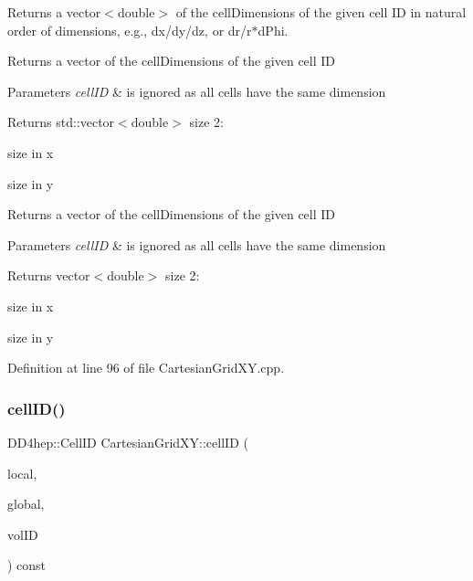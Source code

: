 Returns a vector$<$double$>$ of the cell\+Dimensions of the given cell ID in natural order of dimensions, e.\+g., dx/dy/dz, or dr/r$\ast$d\+Phi. 

Returns a vector of the cell\+Dimensions of the given cell ID 
\begin{DoxyParams}{Parameters}
{\em cell\+ID} & is ignored as all cells have the same dimension \\
\hline
\end{DoxyParams}
\begin{DoxyReturn}{Returns}
std\+::vector$<$double$>$ size 2\+:
\begin{DoxyEnumerate}
\item size in x
\item size in y
\end{DoxyEnumerate}
\end{DoxyReturn}
Returns a vector of the cell\+Dimensions of the given cell ID 
\begin{DoxyParams}{Parameters}
{\em cell\+ID} & is ignored as all cells have the same dimension \\
\hline
\end{DoxyParams}
\begin{DoxyReturn}{Returns}
vector$<$double$>$ size 2\+:
\begin{DoxyEnumerate}
\item size in x
\item size in y 
\end{DoxyEnumerate}
\end{DoxyReturn}


Definition at line 96 of file Cartesian\+Grid\+X\+Y.\+cpp.

\hypertarget{class_d_d4hep_1_1_geometry_1_1_cartesian_grid_x_y_a83c05bd3b39fab868f02b6e44e206a26}{}\label{class_d_d4hep_1_1_geometry_1_1_cartesian_grid_x_y_a83c05bd3b39fab868f02b6e44e206a26} 
\subsubsection{\texorpdfstring{cell\+I\+D()}{cellID()}}
{\footnotesize\ttfamily D\+D4hep\+::\+Cell\+ID Cartesian\+Grid\+X\+Y\+::cell\+ID (\begin{DoxyParamCaption}\item[{const \hyperlink{namespace_d_d4hep_1_1_geometry_a55083902099d03506c6db01b80404900}{Position} \&}]{local,  }\item[{const \hyperlink{namespace_d_d4hep_1_1_geometry_a55083902099d03506c6db01b80404900}{Position} \&}]{global,  }\item[{const Volume\+ID \&}]{vol\+ID }\end{DoxyParamCaption}) const}



